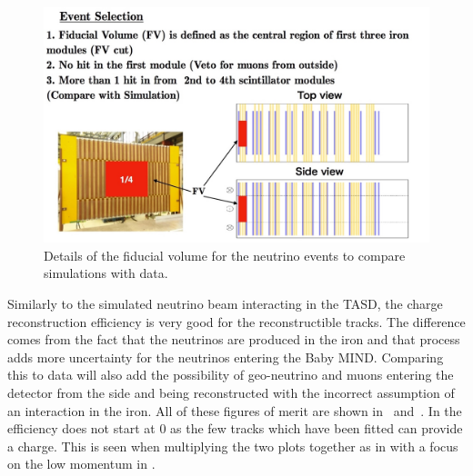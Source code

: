 \begin{figure}
\centering
\includegraphics[width=\textwidth]{figures/NeutrinoChap/NuFactTalk/eventRateCheck.jpeg}
\caption{Details of the fiducial volume for the neutrino events to compare simulations with data.}
\label{fig:MINDFiducial}
\end{figure}

Similarly to the simulated neutrino beam interacting in the TASD, the charge reconstruction efficiency is very good for the reconstructible tracks. The difference comes from the fact that the neutrinos are produced in the iron and that process adds more uncertainty for the neutrinos entering the Baby MIND. Comparing this to data will also add the possibility of geo-neutrino and muons entering the detector from the side and being reconstructed with the incorrect assumption of an interaction in the iron.  All of these figures of merit are shown in~ and~.
In  the efficiency does not start at 0 as the few tracks which have been fitted can provide a charge. This is seen when multiplying the two plots together as in  with a focus on the low momentum in .




